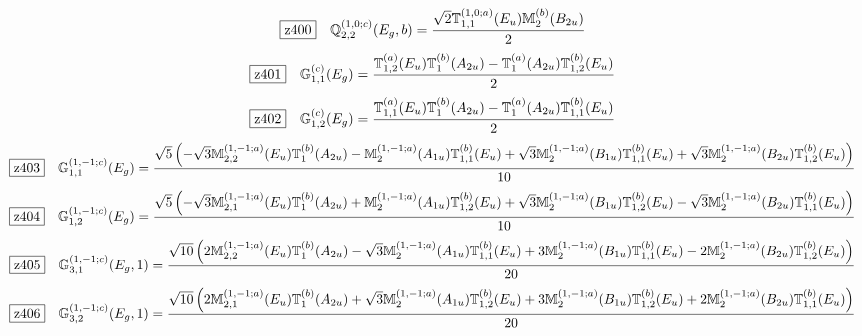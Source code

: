 \documentclass[fleqn,10pt,landscape]{jsarticle}
\begin{document}
\begin{dmath*}
\hspace*{3mm}\fbox{z400}\quad \mathbb{Q}_{2,2}^{(1,0;c)}(E_{g},b)=\frac{\sqrt{2} \mathbb{T}_{1,1}^{(1,0;a)}(E_{u}) \mathbb{M}_{2}^{(b)}(B_{2u})}{2}
\end{dmath*}
\begin{dmath*}
\hspace*{3mm}\fbox{z401}\quad \mathbb{G}_{1,1}^{(c)}(E_{g})=\frac{\mathbb{T}_{1,2}^{(a)}(E_{u}) \mathbb{T}_{1}^{(b)}(A_{2u}) - \mathbb{T}_{1}^{(a)}(A_{2u}) \mathbb{T}_{1,2}^{(b)}(E_{u})}{2}
\end{dmath*}
\begin{dmath*}
\hspace*{3mm}\fbox{z402}\quad \mathbb{G}_{1,2}^{(c)}(E_{g})=\frac{\mathbb{T}_{1,1}^{(a)}(E_{u}) \mathbb{T}_{1}^{(b)}(A_{2u}) - \mathbb{T}_{1}^{(a)}(A_{2u}) \mathbb{T}_{1,1}^{(b)}(E_{u})}{2}
\end{dmath*}
\begin{dmath*}
\hspace*{3mm}\fbox{z403}\quad \mathbb{G}_{1,1}^{(1,-1;c)}(E_{g})=\frac{\sqrt{5} \left(- \sqrt{3} \mathbb{M}_{2,2}^{(1,-1;a)}(E_{u}) \mathbb{T}_{1}^{(b)}(A_{2u}) - \mathbb{M}_{2}^{(1,-1;a)}(A_{1u}) \mathbb{T}_{1,1}^{(b)}(E_{u}) + \sqrt{3} \mathbb{M}_{2}^{(1,-1;a)}(B_{1u}) \mathbb{T}_{1,1}^{(b)}(E_{u}) + \sqrt{3} \mathbb{M}_{2}^{(1,-1;a)}(B_{2u}) \mathbb{T}_{1,2}^{(b)}(E_{u})\right)}{10}
\end{dmath*}
\begin{dmath*}
\hspace*{3mm}\fbox{z404}\quad \mathbb{G}_{1,2}^{(1,-1;c)}(E_{g})=\frac{\sqrt{5} \left(- \sqrt{3} \mathbb{M}_{2,1}^{(1,-1;a)}(E_{u}) \mathbb{T}_{1}^{(b)}(A_{2u}) + \mathbb{M}_{2}^{(1,-1;a)}(A_{1u}) \mathbb{T}_{1,2}^{(b)}(E_{u}) + \sqrt{3} \mathbb{M}_{2}^{(1,-1;a)}(B_{1u}) \mathbb{T}_{1,2}^{(b)}(E_{u}) - \sqrt{3} \mathbb{M}_{2}^{(1,-1;a)}(B_{2u}) \mathbb{T}_{1,1}^{(b)}(E_{u})\right)}{10}
\end{dmath*}
\begin{dmath*}
\hspace*{3mm}\fbox{z405}\quad \mathbb{G}_{3,1}^{(1,-1;c)}(E_{g},1)=\frac{\sqrt{10} \left(2 \mathbb{M}_{2,2}^{(1,-1;a)}(E_{u}) \mathbb{T}_{1}^{(b)}(A_{2u}) - \sqrt{3} \mathbb{M}_{2}^{(1,-1;a)}(A_{1u}) \mathbb{T}_{1,1}^{(b)}(E_{u}) + 3 \mathbb{M}_{2}^{(1,-1;a)}(B_{1u}) \mathbb{T}_{1,1}^{(b)}(E_{u}) - 2 \mathbb{M}_{2}^{(1,-1;a)}(B_{2u}) \mathbb{T}_{1,2}^{(b)}(E_{u})\right)}{20}
\end{dmath*}
\begin{dmath*}
\hspace*{3mm}\fbox{z406}\quad \mathbb{G}_{3,2}^{(1,-1;c)}(E_{g},1)=\frac{\sqrt{10} \left(2 \mathbb{M}_{2,1}^{(1,-1;a)}(E_{u}) \mathbb{T}_{1}^{(b)}(A_{2u}) + \sqrt{3} \mathbb{M}_{2}^{(1,-1;a)}(A_{1u}) \mathbb{T}_{1,2}^{(b)}(E_{u}) + 3 \mathbb{M}_{2}^{(1,-1;a)}(B_{1u}) \mathbb{T}_{1,2}^{(b)}(E_{u}) + 2 \mathbb{M}_{2}^{(1,-1;a)}(B_{2u}) \mathbb{T}_{1,1}^{(b)}(E_{u})\right)}{20}
\end{dmath*}
\end{document}
